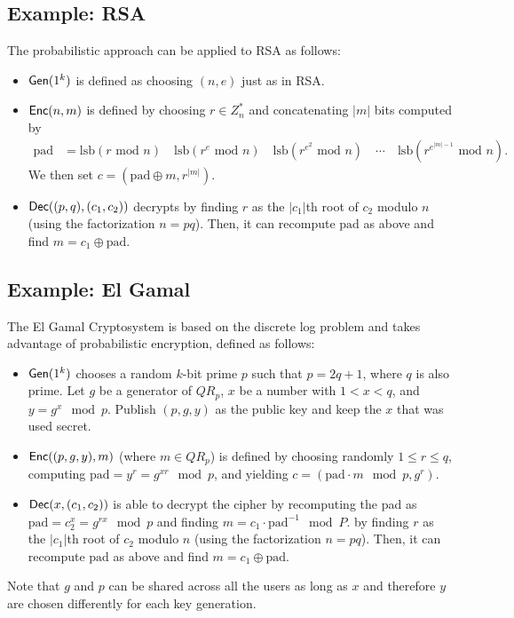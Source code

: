 \documentclass[10pt]{article}
\begin{document}
\subsection{Example: RSA}

The probabilistic approach can be applied to RSA as follows:
\begin{itemize}
	\item $\mathsf{Gen}(1^k)$ is defined as choosing $(n,e)$ just as in RSA.
	\item $\mathsf{Enc}(n,m)$ is defined by choosing $r \in Z_n^{*}$ and concatenating $|m|$ bits computed by
	\begin{align*}
	\text{pad} &= \text{lsb}(r \text{ mod } n) \quad \text{lsb}(r^e \text{ mod } n) \quad  \text{lsb}(r^{e^2} \text{ mod } n) \quad  \cdots \quad  \text{lsb}(r^{e^{|m|-1}} \text{ mod } n).
	\end{align*}
	We then set $c=( \text{pad} \oplus m, r^{|m|})$.
	\item $\mathsf{Dec}((p,q),(c_1, c_2))$ decrypts by finding $r$ as the $|c_1|$th root of $c_2$ modulo $n$ (using the factorization $n=pq$). Then, it can recompute $\text{pad}$ as above and find $m = c_1 \oplus \text{pad}$.
\end{itemize}

\subsection{Example: El Gamal}

The El Gamal Cryptosystem is based on the discrete log problem and takes advantage of probabilistic encryption, defined as follows:
\begin{itemize}
	\item $\mathsf{Gen}(1^k)$ chooses a random $k$-bit prime $p$ such that $p=2q+1$, where $q$ is also prime. Let $g$ be a generator of $QR_p$, $x$ be a number with $1 < x < q$, and $y = g^x \mod p$. Publish $(p,g,y)$ as the public key and keep the $x$ that was used secret.
	\item $\mathsf{Enc}((p,g,y),m)$ (where $m \in QR_p$) is defined by choosing randomly $1 \le r \le q$, computing $\text{pad} = y^r = g^{xr} \mod p$, and yielding $c = (\text{pad} \cdot m \mod p, g^{r})$.
	\item $\mathsf{Dec}(x,(c_1, c_2))$ is able to decrypt the cipher by recomputing the pad as $\text{pad} = c_2^x = g^{rx} \mod p$ and finding $m = c_1 \cdot \text{pad}^{-1} \mod P$. by finding $r$ as the $|c_1|$th root of $c_2$ modulo $n$ (using the factorization $n=pq$). Then, it can recompute $\text{pad}$ as above and find $m = c_1 \oplus \text{pad}$.
\end{itemize}
Note that $g$ and $p$ can be shared across all the users as long as $x$ and therefore $y$ are chosen differently for each key generation. 
\end{document}
